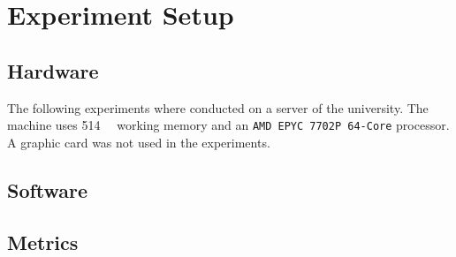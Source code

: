 \section{Experiment Setup}\label{sec:experiment-setup}
\subsection{Hardware}\label{subsec:experiment-setup_hardware}
The following experiments where conducted on a server of the university. The machine uses \SI{514}{\gibi\byte} working memory and an \texttt{AMD EPYC 7702P 64-Core} processor. A graphic card was not used in the experiments.


\subsection{Software}\label{subsec:experiment-setup_software}


\subsection{Metrics}\label{subsec:experiment-setup_metrics}
